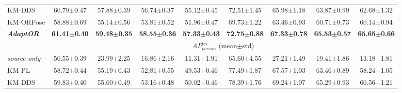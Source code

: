 \begin{table*}[t]
{\begin{tabular}{l|cccc|cccc}
			KM-DDS                   & 60.79$\pm$0.47                                                                                        & 57.88$\pm$0.39                                                  & 56.74$\pm$0.37          & 55.12$\pm$0.45          & 72.51$\pm$1.45          & 65.98$\pm$1.18          & 63.87$\pm$0.99          & 62.68$\pm$1.32 \Tstrut          \\
			KM-ORPose                & 58.88$\pm$0.69                                                                                        & 55.14$\pm$0.56                                                  & 53.81$\pm$0.52          & 51.96$\pm$0.47          & 69.73$\pm$1.22          & 63.46$\pm$0.93          & 60.71$\pm$0.73          & 60.14$\pm$0.94 \Tstrut          \\ \hline
			\emph{\textbf{AdaptOR}}  & \textbf{61.41$\pm$0.40}                                                                               & \textbf{59.48$\pm$0.35}                                         & \textbf{58.55$\pm$0.36} & \textbf{57.33$\pm$0.43} & \textbf{72.75$\pm$0.88} & \textbf{67.33$\pm$0.78} & \textbf{65.53$\pm$0.57} & \textbf{65.65$\pm$0.66} \Tstrut
			\\\hline
			                         & \multicolumn{8}{c}{$\mathit{AP_{person}^{kp}}$ (mean$\pm$std)} \Tstrut \Bstrut                                                                                                                                                                                                                                                     \\
			\hline
			\emph{source-only}       & 50.55$\pm$0.39                                                                                        & 23.99$\pm$2.25                                                  & 16.86$\pm$2.16          & 11.31$\pm$1.91          & 65.60$\pm$4.55          & 27.21$\pm$1.49          & 19.41$\pm$1.86          & 13.18$\pm$1.81 \Tstrut          \\\hline
			KM-PL                    & 58.72$\pm$0.44                                                                                        & 55.19$\pm$0.43                                                  & 52.81$\pm$0.55          & 49.53$\pm$0.46          & 77.49$\pm$1.87          & 67.57$\pm$1.03          & 63.46$\pm$0.89          & 58.24$\pm$1.05 \Tstrut          \\
			KM-DDS                   & 59.83$\pm$0.40                                                                                        & 55.60$\pm$0.49                                                  & 53.16$\pm$0.48          & 50.02$\pm$0.46          & 78.39$\pm$1.76          & 69.24$\pm$1.07          & 65.29$\pm$0.93          & 60.56$\pm$1.21 \Tstrut          \\

\end{tabular}}
\end{table*}
